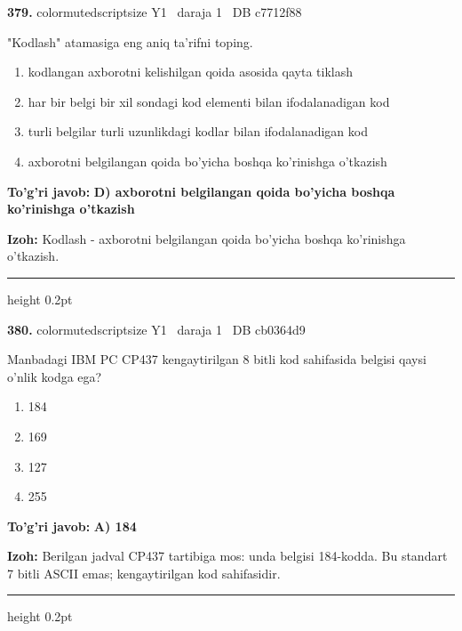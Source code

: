\documentclass[10pt,a4paper,oneside]{article}
\begin{document}
\noindent\textbf{\color{ink}379.}  {color{muted}scriptsize Y1 \textbullet\ daraja 1 \textbullet\ DB c7712f88}
\par
"Kodlash" atamasiga eng aniq ta'rifni toping.
\begin{enumerate}[label=\Alph*),leftmargin=9mm]
\item kodlangan axborotni kelishilgan qoida asosida qayta tiklash
\item har bir belgi bir xil sondagi kod elementi bilan ifodalanadigan kod
\item turli belgilar turli uzunlikdagi kodlar bilan ifodalanadigan kod
\item axborotni belgilangan qoida bo'yicha boshqa ko'rinishga o'tkazish
\end{enumerate}
\begin{tcolorbox}[enhanced,breakable,colback=teal!4,colframe=teal!50!black,boxrule=0.5pt,arc=1.1mm,left=3mm,right=3mm,top=1.7mm,bottom=1.7mm,before skip=2mm,after skip=2mm]
\textbf{\color{teal}To'g'ri javob:} \textbf{D) axborotni belgilangan qoida bo'yicha boshqa ko'rinishga o'tkazish}
\par\smallskip
\textbf{Izoh:} Kodlash - axborotni belgilangan qoida bo'yicha boshqa ko'rinishga o'tkazish.
\end{tcolorbox}
\vspace{2mm}\hrule height 0.2pt \vspace{3mm}

\noindent\textbf{\color{ink}380.}  {color{muted}scriptsize Y1 \textbullet\ daraja 1 \textbullet\ DB cb0364d9}
\par
Manbadagi IBM PC CP437 kengaytirilgan 8 bitli kod sahifasida \texttt{\textcopyright{}} belgisi qaysi o'nlik kodga ega?
\begin{enumerate}[label=\Alph*),leftmargin=9mm]
\item 184
\item 169
\item 127
\item 255
\end{enumerate}
\begin{tcolorbox}[enhanced,breakable,colback=teal!4,colframe=teal!50!black,boxrule=0.5pt,arc=1.1mm,left=3mm,right=3mm,top=1.7mm,bottom=1.7mm,before skip=2mm,after skip=2mm]
\textbf{\color{teal}To'g'ri javob:} \textbf{A) 184}
\par\smallskip
\textbf{Izoh:} Berilgan jadval CP437 tartibiga mos: unda \textcopyright{} belgisi 184-kodda. Bu standart 7 bitli ASCII emas; kengaytirilgan kod sahifasidir.
\end{tcolorbox}
\vspace{2mm}\hrule height 0.2pt \vspace{3mm}
\end{document}
